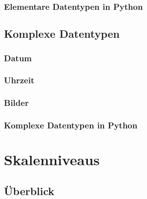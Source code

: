 \documentclass[
  oneside]{book}
\begin{document}
\hypertarget{elementare-datentypen-in-python}{%
\subsubsection{Elementare Datentypen in Python}\label{elementare-datentypen-in-python}}

\hypertarget{komplexe-datentypen}{%
\subsection{Komplexe Datentypen}\label{komplexe-datentypen}}

\hypertarget{datum}{%
\subsubsection{Datum}\label{datum}}

\hypertarget{uhrzeit}{%
\subsubsection{Uhrzeit}\label{uhrzeit}}

\hypertarget{bilder}{%
\subsubsection{Bilder}\label{bilder}}

\hypertarget{komplexe-datentypen-in-python}{%
\subsubsection{Komplexe Datentypen in Python}\label{komplexe-datentypen-in-python}}

\hypertarget{skalenniveaus}{%
\section{Skalenniveaus}\label{skalenniveaus}}

\hypertarget{uxfcberblick}{%
\subsection{Überblick}\label{uxfcberblick}}
\end{document}
